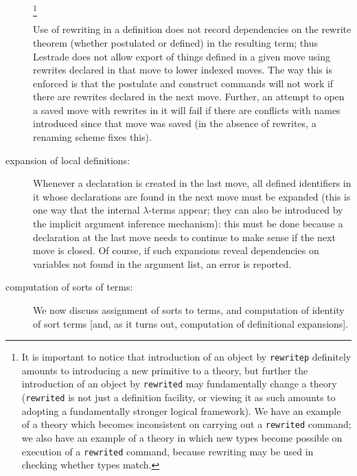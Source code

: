 \documentclass[12pt]{article}
\begin{document}
\begin{description}
\footnote{It is important to notice that introduction of an object by {\tt rewritep} definitely amounts to introducing a new primitive to a theory, but further the introduction of an object by {\tt rewrited} may fundamentally change a theory ({\tt rewrited} is not just a definition facility, or viewing it as such amounts to adopting a fundamentally stronger logical framework).  We have an example of a theory which becomes inconsistent on carrying out a {\tt rewrited} command;  we also have an example of a theory in which new types become possible on execution of a {\tt rewrited} command, because rewriting may be used in checking whether types match.}

Use of rewriting in a definition does not record dependencies on the rewrite theorem (whether postulated or defined) in the resulting term;  thus Lestrade does not allow export of things
defined in a given move using rewrites declared in that move to lower indexed moves.  The way this is enforced is that the postulate and construct commands will not work if there are rewrites declared in the next move.  Further, an attempt to open a saved move with rewrites in it will fail if there are conflicts with names introduced since that move was saved (in the absence of rewrites, a renaming scheme fixes this).

\item[expansion of local definitions:]  Whenever a declaration is created in the last move, all defined identifiers in it whose declarations are found in the next move must be expanded (this is one
way that the internal $\lambda$-terms appear; they can also be introduced by the implicit argument inference mechanism):  this must be done because a declaration at the last move needs to continue to make sense if the next move is closed.
Of course, if such expansions reveal dependencies on variables not found in the argument list, an error is reported.

\item[computation of sorts of terms:]  We now discuss assignment of sorts to terms, and computation of identity of sort terms [and, as it turns out, computation of definitional expansions].


\end{description}
\end{document}
